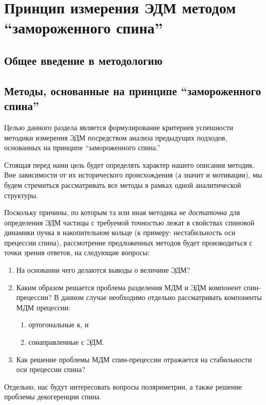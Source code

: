 \chapter{Принцип измерения ЭДМ методом ``замороженного спина'' }\label{chpt1:top-level}

\section{Общее введение в методологию}\label{chpt1:FS-introduction}


\section{Методы, основанные на   принципе ``замороженного спина''}\label{chpt1:FS-methods}
Целью данного раздела является формулирование критериев успешности методики измерения ЭДМ 
посредством анализа предыдущих подходов, основанных на принципе ``замороженного спина.''

Стоящая перед нами цель будет определять характер нашего описания методик. Вне зависимости от их
исторического происхождения (а значит и мотивации), мы будем стремиться рассматривать все методы
 в рамках одной аналитической структуры.

Поскольку причины, по которым та или иная методика \emph{не достаточна} для определения ЭДМ частицы с 
требуемой точностью лежат в свойствах спиновой динамики пучка в накопительном кольце
(к примеру: нестабильность оси прецессии спина), рассмотрение предложенных методов 
будет производиться с точки зрения ответов, на следующие вопросы:
\begin{enumerate}[(1)]
	\item На основании чего делаются выводы о величине ЭДМ?
	\item Каким образом решается проблема разделения МДМ и ЭДМ компонент спин-прецессии? 
	В данном случае необходимо отдельно рассматривать компоненты МДМ прецессии:
	\begin{enumerate}
		\item ортогональные к, и
		\item сонаправленные с ЭДМ.
	\end{enumerate}
	\item Как решение проблемы МДМ спин-прецессии отражается на стабильности оси прецессии спина?
\end{enumerate}
Отдельно, нас будут интересовать вопросы поляриметрии, а также решение проблемы декогеренции спина. 

